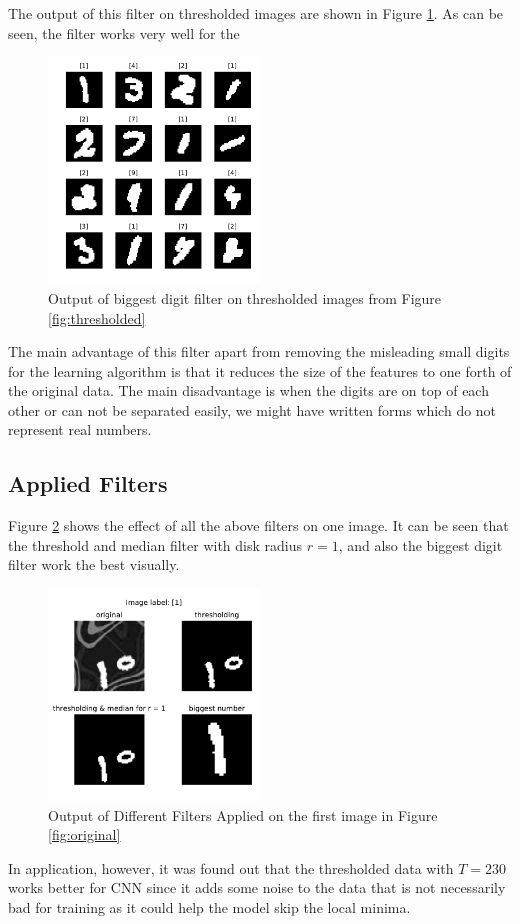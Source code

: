 \documentclass[letterpaper, 10 pt, conference]{ieeeconf}  %
\begin{document}
The output of this filter on thresholded images are shown in Figure \ref{fig:biggest}. As can be seen, the filter works very well for the 
\begin{figure}[h]
	\begin{center}
		\includegraphics[width=0.5\textwidth]{figures/BiggestDataset.pdf}  %
		\caption{Output of biggest digit filter on thresholded images from Figure \ref{fig:thresholded}}
		\label{fig:biggest}
	\end{center}
\end{figure}
The main advantage of this filter apart from removing the misleading small digits for the learning algorithm is that it reduces the size of the features to one forth of the original data. The main disadvantage is when the digits are on top of each other or can not be separated easily, we might have written forms which do not represent real numbers.
\subsection{Applied Filters}
Figure \ref{fig:allFilters} shows the effect of all the above filters on one image. It can be seen that the threshold and median filter with disk radius $r=1$, and also the biggest digit filter work the best visually.
\begin{figure}[h]
	\begin{center}
		\includegraphics[width=0.5\textwidth]{figures/allDataset.pdf}  %
		\caption{Output of Different Filters Applied on the first image in Figure \ref{fig:original}}
		\label{fig:allFilters}
	\end{center}
\end{figure}
In application, however, it was found out that the thresholded data with $T=230$ works better for CNN since it adds some noise to the data that is not necessarily bad for training as it could help the model skip the local minima.
\end{document}
